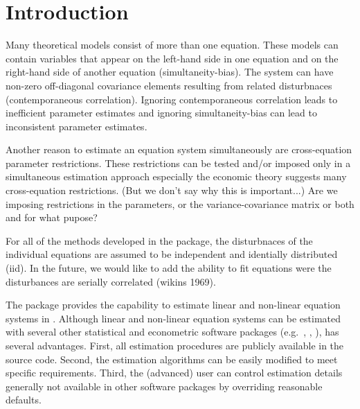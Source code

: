 


\section{Introduction}

Many theoretical models consist of more than one equation. These
models can contain variables that appear on the left-hand side in one
equation and on the right-hand side of another equation
(simultaneity-bias). The system can have non-zero off-diagonal
covariance elements resulting from related disturbnaces
(contemporaneous correlation). Ignoring contemporaneous correlation
leads to inefficient parameter estimates \citep{zellner62} and
ignoring simultaneity-bias can lead to inconsistent parameter
estimates. 


Another reason to estimate an equation system simultaneously are
cross-equation parameter restrictions. These restrictions can be
tested and/or imposed only in a simultaneous estimation approach
especially the economic theory suggests many cross-equation
restrictions. (But we don't say why this is important...) Are we
imposing restrictions in the parameters, or the variance-covariance
matrix or both and for what pupose?


For all of the methods developed in the package, the disturbnaces of
the individual equations are assumed to be independent and identially
distributed (iid).  
In the future, we would like to add the ability to fit equations were
the disturbances are serially correlated (wikins 1969).

The  package provides the capability to estimate
linear and non-linear equation systems in .
Although linear and non-linear equation systems can be estimated
with several other statistical and econometric software packages
(e.g.\ , , ),
 has several advantages.
First, all estimation procedures are publicly available in the source code.
Second, the estimation algorithms can be easily modified to meet specific
requirements.
Third, the (advanced) user can control estimation details generally
not available in other software packages by overriding reasonable defaults.

